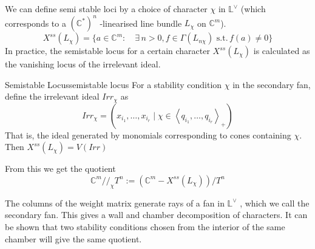 We can define semi stable loci by a choice of character $\chi$ in $\mathbb{L}^\vee$ (which corresponds to a $(\mathbb{C}^*)^n$ -linearised line bundle $L_\chi$ on $\mathbb{C}^{m}$). $$X^{ss}(L_\chi) = \{ a \in \mathbb{C}^{m}: \quad \exists\, n>0, f\in \Gamma(L_{n\chi})\,\,\text{s.t.} \,f(a)\neq 0 \}$$ In practice, the semistable locus for a certain character $X^{ss}(L_\chi)$ is calculated as the vanishing locus of the irrelevant ideal.

\begin{definition}{Semistable Locus}{semistable locus}
	For a stability condition $\chi$ in the secondary fan, define the irrelevant ideal $Irr_\chi$ as $$
Irr_{\chi}= (x_{i_{1}},\dots,x_{i_{r}} \mid \chi \in \left< q_{i_{1}},\dots,q_{i_{r}}\right>_{+} )
$$ That is, the ideal generated by monomials corresponding to cones containing $\chi$. 
Then $X^{ss} (L_{\chi}) = V(Irr)$
\end{definition}

From this we get the quotient $$
\mathbb{C}^{m}//_{\chi}T^{n}:= \left(\mathbb{C}^{m}-X^{ss}(L_{\chi})\right)  /T^n
$$

The columns of the weight matrix generate rays of a fan in $\mathbb{L}^\vee$ , which we call the secondary fan. This gives a wall and chamber decomposition of characters. It can be shown that two stability conditions chosen from the interior of the same chamber will give the same quotient. 

